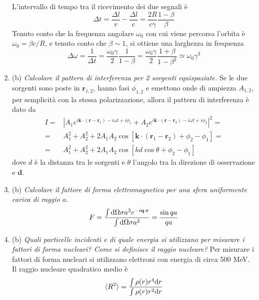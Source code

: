 \documentclass{article}
\renewcommand{\b}{(b)}
\renewcommand{\t}[1]{\textit{ #1}}
\renewcommand{\vec}[1]{\mathbf{#1}}
\begin{document}
\begin{enumerate}
\begin{center}
	\end{center}L'intervallo di tempo tra il ricevimento dei due segnali è
	\[\Delta t=\frac{\Delta l}{v}-\frac{\Delta l}{c}=\frac{2R}{c\gamma}\frac{1-\beta}{\beta}\]
	Tenuto conto che la frequenza angolare $\omega_0$ con cui viene percorsa l'orbita è $\omega_0=\beta c/R$, e tenuto conto che $\beta\sim1$, si ottiene una larghezza in frequenza
	\[\Delta\omega=\frac{1}{\Delta t}=\frac{\omega_0\gamma}{2}\frac{1}{1-\beta}=\frac{\omega_0\gamma}{2}\frac{1+\beta}{1-\beta^2}\simeq\omega_0\gamma^3\]
	\item\b\t{Calcolare il pattern di interferenza per 2 sorgenti equispaziate.} Se le due sorgenti sono poste in $\vec{r}_{1,2}$, hanno fasi $\phi_{1,2}$ e emettono onde di ampiezza $A_{1,2}$, per semplicità con la stessa polarizzazione, allora il pattern di interferenza è dato da
	\begin{align*}I=&\left|A_1e^{i\vec{k}\cdot(\vec{r}-\vec{r}_1)-i\omega t+i\phi_1}+A_2e^{i\vec{k}\cdot(\vec{r}-\vec{r}_2)-i\omega t+i\phi_2}\right|^2=\\=&A_1^2+A_2^2+2A_1A_2\cos[\vec{k}\cdot(\vec{r}_1-\vec{r}_2)+\phi_2-\phi_1]=\\=&A_1^2+A_2^2+2A_1A_2\cos[kd\cos\theta+\phi_2-\phi_1]\end{align*}
	dove $d$ è la distanza tra le sorgenti e $\theta$ l'angolo tra la direzione di osservazione e $\vec{d}$.
	\item\b\t{Calcolare il fattore di forma elettromagnetico per una sfera uniformente carica di
		raggio $a$.}
	\[F=\frac{\int \d \Omega \sigma a^2e^{-i\vec{q}\cdot\vec{r}}}{\int \d \Omega \sigma a^2}=\frac{\sin qa}{qa}\]
	\item\b\t{Quali particelle incidenti e di quale energia si utilizzano per misurare i fattori di
		forma nucleari? Come si definisce il raggio nucleare?} Per misurare i fattori di forma nucleari si utilizzano elettroni con energia di circa 500 MeV. Il raggio nucleare quadratico medio è
	\[\langle R^2\rangle=\frac{\int\rho(r)r^4\mathrm{d} r}{\int\rho(r)r^2\mathrm{d} r}\]

\end{enumerate}
\end{document}
